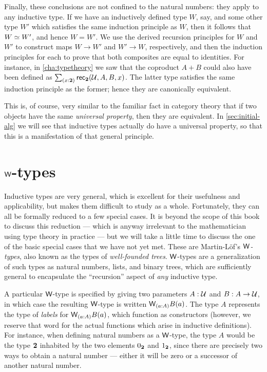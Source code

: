 Finally, these conclusions are not confined to the natural numbers: they apply to any inductive type.
If we have an inductively defined type $W$, say, and some other type $W'$ which satisfies the same induction principle as $W$, then it follows that $W \simeq W'$, and hence $W=W'$.
We use the derived recursion principles for $W$ and $W'$ to construct maps $W\to W'$ and $W'\to W$, respectively, and then the induction principles for each to prove that both composites are equal to identities.
For instance, in \autoref{cha:typetheory} we saw that the coproduct $A+B$ could also have been defined as $\sm{x:\bool} \rec{\bool}(\UU,A,B,x)$.
The latter type satisfies the same induction principle as the former; hence they are canonically equivalent.

This is, of course, very similar to the familiar fact in category theory that if two objects have the same \emph{universal property}, then they are equivalent.
In \autoref{sec:initial-alg} we will see that inductive types actually do have a universal property, so that this is a manifestation of that general principle.


\section{$\mathsf{W}$-types}
\label{sec:w-types}

Inductive types are very general, which is excellent for their usefulness and applicability, but makes them difficult to study as a whole.
Fortunately, they can all be formally reduced to a few special cases.
It is beyond the scope of this book to discuss this reduction --- which is anyway irrelevant to the mathematician using type theory in practice --- but we will take a little time to discuss the one of the basic special cases that we have not yet met.
These are Martin-L{\"o}f's \emph{$\mathsf{W}$-types}, also known as the types of \emph{well-founded trees}.
%
$\mathsf{W}$-types are a generalization of such types as natural numbers, lists, and binary trees, which are sufficiently general to encapsulate the ``recursion'' aspect of \emph{any} inductive type.

A particular $\mathsf{W}$-type is specified by giving two parameters $A : \mathcal{U}$ and $B : A \to \mathcal{U}$, in which case the resulting $\mathsf{W}$-type is written $\wtype{a:A} B(a)$.
The type $A$ represents the type of \emph{labels} for $\wtype{a :A} B(a)$, which function as constructors (however, we reserve that word for the actual functions which arise in inductive definitions). For instance, when defining natural numbers as a $\mathsf{W}$-type,%
the type $A$ would be the type $\mathbf{2}$ inhabited by the two elements ${0_{\mathbf{2}}}$ and ${1_{\mathbf{2}}}$, since there are precisely two ways to obtain a natural number --- either it will be zero or a successor of another natural number. 

